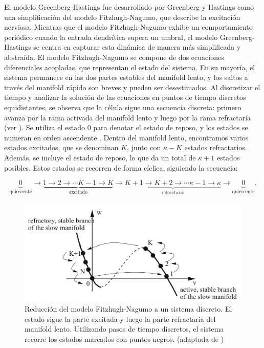 El modelo Greenberg-Hastings fue desarrollado por Greenberg y Hastings como una simplificación del modelo Fitzhugh-Nagumo, que describe la excitación nerviosa. Mientras que el modelo Fitzhugh-Nagumo exhibe un comportamiento periódico cuando la entrada dendrítica supera un umbral, el modelo Greenberg-Hastings se centra en capturar esta dinámica de manera más simplificada y abstraída. El modelo Fitzhugh-Nagumo se compone de dos ecuaciones diferenciales acopladas, que representan el estado del sistema. En su mayoría, el sistema permanece en las dos partes estables del manifold lento, y los saltos a través del manifold rápido son breves y pueden ser desestimados. Al discretizar el tiempo y analizar la solución de las ecuaciones en puntos de tiempo discretos equidistantes, se observa que la célula sigue una secuencia discreta: primero avanza por la rama activada del manifold lento y luego por la rama refractaria (ver  ). Se utiliza el estado 0 para denotar el estado de reposo, y los estados se numeran en orden ascendente \cite{hadeler_cellular_2017}. Dentro del manifold lento, encontramos varios estados excitados, que se denominan $K$, junto con $\kappa - K$ estados refractarios. Además, se incluye el estado de reposo, lo que da un total de $\kappa + 1$ estados posibles. Estos estados se recorren de forma cíclica, siguiendo la secuencia:

\begin{equation}
	\underbrace{0}_{\text{quiescente}}\to \underbrace{1\to2\to\cdots K-1\to K}_{\text{excitado}}\to\underbrace{K+1\to K+2\to\cdots \kappa-1\to \kappa}_{\text{refractario}}\to\underbrace{0}_{\text{quiescente}}.
\end{equation}

\begin{figure}[h!]
	\centering\includegraphics[width=\imsize]{Nagumo.png}
	\caption[Reducción del modelo Fitzhugh-Nagumo a un sistema discreto. ]{Reducción del modelo Fitzhugh-Nagumo a un sistema discreto. El estado sigue la parte excitada y luego la parte refractaria del manifold lento. Utilizando pasos de tiempo discretos, el sistema recorre los estados marcados con puntos negros. (adaptada de \protect\cite{hadeler_cellular_2017})}\label{fig:Nagumo}
\end{figure}

